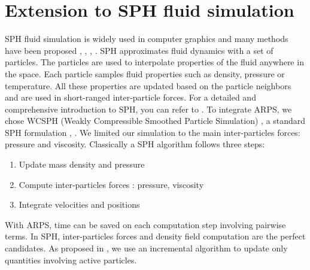 \section{ Extension to SPH fluid simulation } \label{sec sph}
SPH fluid simulation is widely used in computer graphics and many methods have been proposed \cite{Desbrun:1996:SPN}, \cite{Muller2003}, \cite{Solenthaler2009}, \cite{implicitSPH}.
SPH approximates fluid dynamics with a set of particles.
The particles are used to interpolate properties of the fluid anywhere in the space.
Each particle samples fluid properties such as density, pressure or temperature. All these properties are updated based on the particle neighbors and are
used in short-ranged inter-particle forces.
For a detailed and comprehensive introduction to SPH, you can refer to \cite{Monaghan2005}.
To integrate ARPS, we chose WCSPH (Weakly Compressible Smoothed Particle Simulation) \cite{Becker2007WCSPH}, a standard SPH formulation \cite{Desbrun:1996:SPN}, \cite{Muller2003}.
We limited our simulation to the main inter-particles forces: pressure and viscosity.
Classically a SPH algorithm follows three steps:
\begin{enumerate}
	\item Update mass density and pressure
	\item Compute inter-particles forces : pressure, viscosity
	\item Integrate velocities and positions
\end{enumerate}
With ARPS, time can be saved on each computation step involving pairwise terms.
In SPH, inter-particles forces and density field computation are the perfect candidates.
As proposed in \cite{Artemova2012}, we use an incremental algorithm to update only quantities involving active particles.
